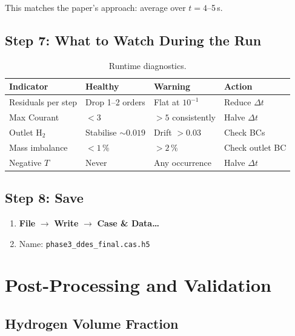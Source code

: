 \documentclass[12pt,a4paper]{report}
\begin{document}
\noindent This matches the paper's approach: average over $t = 4$--5\,s.


\section{Step 7: What to Watch During the Run}

\begin{table}[H]
\centering
\caption{Runtime diagnostics.}
\begin{tabular}{@{}llll@{}}
\toprule
\textbf{Indicator} & \textbf{Healthy} & \textbf{Warning} & \textbf{Action} \\
\midrule
Residuals per step & Drop 1--2 orders & Flat at $10^{-1}$ & Reduce $\Delta t$ \\
Max Courant        & $< 3$ & $> 5$ consistently & Halve $\Delta t$ \\
Outlet H$_2$       & Stabilise $\sim 0.019$ & Drift $> 0.03$ & Check BCs \\
Mass imbalance     & $< 1\,\%$ & $> 2\,\%$ & Check outlet BC \\
Negative $T$       & Never & Any occurrence & Halve $\Delta t$ \\
\bottomrule
\end{tabular}
\end{table}


\section{Step 8: Save}

\begin{enumerate}
  \item \textbf{File} $\rightarrow$ \textbf{Write} $\rightarrow$
        \textbf{Case \& Data\ldots}
  \item Name: \texttt{phase3\_ddes\_final.cas.h5}
\end{enumerate}


\chapter{Post-Processing and Validation}
\label{ch:post}

\section{Hydrogen Volume Fraction}
\end{document}
